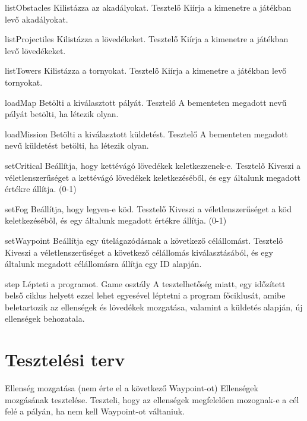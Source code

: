 \usecase
{listObstacles}
{Kilistázza az akadályokat.}
{Tesztelő}
{Kiírja a kimenetre a játékban levő akadályokat.}

\usecase
{listProjectiles}
{Kilistázza a lövedékeket.}
{Tesztelő}
{Kiírja a kimenetre a játékban levő lövedékeket.}

\usecase
{listTowers}
{Kilistázza a tornyokat.}
{Tesztelő}
{Kiírja a kimenetre a játékban levő tornyokat.}

\usecase
{loadMap}
{Betölti a kiválasztott pályát.}
{Tesztelő}
{A bementeten megadott nevű pályát betölti, ha létezik olyan.}

\usecase
{loadMission}
{Betölti a kiválasztott küldetést.}
{Tesztelő}
{A bementeten megadott nevű küldetést betölti, ha létezik olyan.}

\usecase
{setCritical}
{Beállítja, hogy kettévágó lövedékek keletkezzenek-e.}
{Tesztelő}
{Kiveszi a véletlenszerűséget a kettévágó lövedékek keletkezéséből, és egy általunk megadott értékre állítja. (0-1)}

\usecase
{setFog}
{Beállítja, hogy legyen-e köd.}
{Tesztelő}
{Kiveszi a véletlenszerűséget a köd keletkezéséből, és egy általunk megadott értékre állítja. (0-1)}

\usecase
{setWaypoint}
{Beállítja egy útelágazódásnak a következő célállomást.}
{Tesztelő}
{Kiveszi a véletlenszerűséget a következő célállomás kiválasztásából, és egy általunk megadott célállomásra állítja egy ID alapján.}

\usecase
{step}
{Lépteti a programot.}
{Game osztály}
{A tesztelhetőség miatt, egy időzített belső ciklus helyett ezzel lehet egyesével léptetni a program főciklusát,
 amibe beletartozik az ellenségek és lövedékek mozgatása, valamint a küldetés alapján, új ellenségek behozatala.}

\section{Tesztelési terv}

\teszteset
{Ellenség mozgatása (nem érte el a következő Waypoint-ot)} %
{Ellenségek mozgásának tesztelése.} %
{Teszteli, hogy az ellenségek megfelelően mozognak-e a cél felé a pályán, ha nem kell Waypoint-ot váltaniuk.} %

